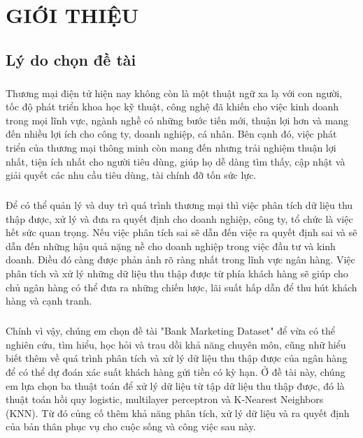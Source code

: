 \documentclass{report}
\begin{document}
\fontsize{13}{20}\selectfont
\listoftables
\pagebreak

\fontsize{13}{20}\selectfont
\listoffigures
\pagebreak

\setcounter{page}{1}
\fontsize{18}{10}\selectfont
\chapter{GIỚI THIỆU}
\fontsize{16}{10}\selectfont
\section{Lý do chọn đề tài}
    \fontsize{13}{10}\selectfont\paragraph{}
        Thương mại điện tử hiện nay không còn là một thuật ngữ xa lạ với con người, tốc độ phát triển khoa học kỹ thuật, công nghệ đã khiến cho việc kinh doanh trong mọi lĩnh vực, ngành nghề có những bước tiến mới, thuận lợi hơn và mang đến nhiều lợi ích cho công ty, doanh nghiệp, cá nhân. Bên cạnh đó, việc phát triển của thương mại thông minh còn mang đến nhưng trải nghiệm thuận lợi nhất, tiện ích nhất cho người tiêu dùng, giúp họ dễ dàng tìm thấy, cập nhật và giải quyết các nhu cầu tiêu dùng, tài chính đỡ tốn sức lực.
    \fontsize{13}{10}\selectfont\paragraph{}
        Để có thể quản lý và duy trì quá trình thương mại thì việc phân tích dữ liệu thu thập được, xử lý và đưa ra quyết định cho doanh nghiệp, công ty, tổ chức là việc hết sức quan trọng. Nếu việc phân tích sai sẽ dẫn đến việc ra quyết định sai và sẽ dẫn đến những hậu quả nặng nề cho doanh nghiệp trong việc đầu tư và kinh doanh. Điều đó càng được phản ảnh rõ ràng nhất trong lĩnh vực ngân hàng. Việc phân tích và xử lý những dữ liệu thu thập được từ phía khách hàng sẽ giúp cho chủ ngân hàng có thể đưa ra những chiến lược, lãi suất hấp dẫn để thu hút khách hàng và cạnh tranh.
    \fontsize{13}{10}\selectfont\paragraph{}
        Chính vì vậy, chúng em chọn đề tài "Bank Marketing Dataset" để vừa có thể nghiên cứu, tìm hiểu, học hỏi và trau dồi khả năng chuyên môn, cũng nhữ hiểu biết thêm về quá trình phân tích và xử lý dữ liệu thu thập được của ngân hàng để có thể dự đoán xác suất khách hàng gửi tiền có kỳ hạn. Ở đề tài này, chúng em lựa chọn ba thuật toán để xử lý dữ liệu từ tập dữ liệu thu thập được, đó là thuật toán hồi quy logistic, multilayer perceptron và K-Nearest Neighbors (KNN). Từ đó củng cố thêm khả năng phân tích, xử lý dữ liệu và ra quyết định của bản thân phục vụ cho cuộc sống và công việc sau này.
\end{document}

